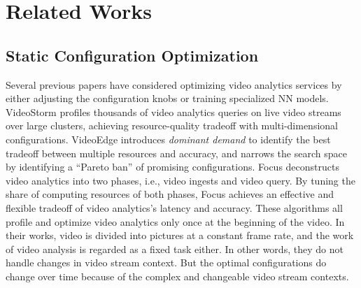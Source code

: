 \section{Related Works}
\label{Section: related_works}

\subsection{Static Configuration Optimization}
Several previous papers have considered optimizing video analytics services by either adjusting the configuration knobs or training specialized NN models. VideoStorm \cite{zhang2017videostorm} profiles thousands of video analytics queries on live video streams over large clusters, achieving resource-quality tradeoff with multi-dimensional configurations. VideoEdge \cite{hung2018videoedge} introduces \emph{dominant demand} to identify the best tradeoff between multiple resources and accuracy, and narrows the search space by identifying a ``Pareto ban'' of promising configurations. 
Focus \cite{hsieh2018focus} deconstructs video analytics into two phases, i.e., video ingests and video query. By tuning the share of computing resources of both phases, Focus achieves an effective and flexible tradeoff of video analytics's latency and accuracy. These algorithms all profile and optimize video analytics only once at the beginning of the video. In their works, video is divided into pictures at a constant frame rate, and the work of video analysis is regarded as a fixed task either. In other words, they do not handle changes in video stream context. But the optimal configurations do change over time because of the complex and changeable video stream contexts.

